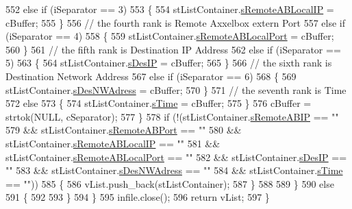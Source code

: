 \begin{DoxyCode}
552                 \textcolor{keywordflow}{else} \textcolor{keywordflow}{if} (iSeparator == 3)
553                 \{
554                     stListContainer.\hyperlink{structstListContainer_a661224bc268bac73ea4c4f179626f04b}{sRemoteABLocalIP} = cBuffer;
555                 \}
556                 \textcolor{comment}{// the fourth rank is Remote Axxelbox extern Port}
557                 \textcolor{keywordflow}{else} \textcolor{keywordflow}{if} (iSeparator == 4)
558                 \{
559                     stListContainer.\hyperlink{structstListContainer_aeadf64994288c18847cb1b9fc244922f}{sRemoteABLocalPort} = cBuffer;
560                 \}
561                 \textcolor{comment}{// the fifth rank is Destination IP Address}
562                 \textcolor{keywordflow}{else} \textcolor{keywordflow}{if} (iSeparator == 5)
563                 \{
564                     stListContainer.\hyperlink{structstListContainer_ab4fde5a0381565943612e2e672b02513}{sDesIP} = cBuffer;
565                 \}
566                 \textcolor{comment}{// the sixth rank is Destination Network Address}
567                 \textcolor{keywordflow}{else} \textcolor{keywordflow}{if} (iSeparator == 6)
568                 \{
569                     stListContainer.\hyperlink{structstListContainer_ae886a76fb72d96cbc124544538905ef8}{sDesNWAdress} = cBuffer;
570                 \}
571                 \textcolor{comment}{// the seventh rank is Time}
572                 \textcolor{keywordflow}{else}
573                 \{
574                     stListContainer.\hyperlink{structstListContainer_acec007ec5b8190c8bf0242980b0b7528}{sTime} = cBuffer;
575                 \}
576                 cBuffer = strtok(NULL, cSeparator);
577             \}
578             \textcolor{keywordflow}{if} (!(stListContainer.\hyperlink{structstListContainer_a2d926770549c1af0e1282f20cdc241e5}{sRemoteABIP} == \textcolor{stringliteral}{""}
579                     && stListContainer.\hyperlink{structstListContainer_ad2a9d2c715866e4fe3a2c588ab3105f0}{sRemoteABPort} == \textcolor{stringliteral}{""}
580                     && stListContainer.\hyperlink{structstListContainer_a661224bc268bac73ea4c4f179626f04b}{sRemoteABLocalIP} == \textcolor{stringliteral}{""}
581                     && stListContainer.\hyperlink{structstListContainer_aeadf64994288c18847cb1b9fc244922f}{sRemoteABLocalPort} == \textcolor{stringliteral}{""}
582                     && stListContainer.\hyperlink{structstListContainer_ab4fde5a0381565943612e2e672b02513}{sDesIP} == \textcolor{stringliteral}{""}
583                     && stListContainer.\hyperlink{structstListContainer_ae886a76fb72d96cbc124544538905ef8}{sDesNWAdress} == \textcolor{stringliteral}{""}
584                     && stListContainer.\hyperlink{structstListContainer_acec007ec5b8190c8bf0242980b0b7528}{sTime} == \textcolor{stringliteral}{""}))
585             \{
586                 vList.push\_back(stListContainer);
587             \}
588 
589         \}
590         \textcolor{keywordflow}{else}
591         \{
592 
593         \}
594     \}
595     infile.close();
596     \textcolor{keywordflow}{return} vList;
597 \}
\end{DoxyCode}
